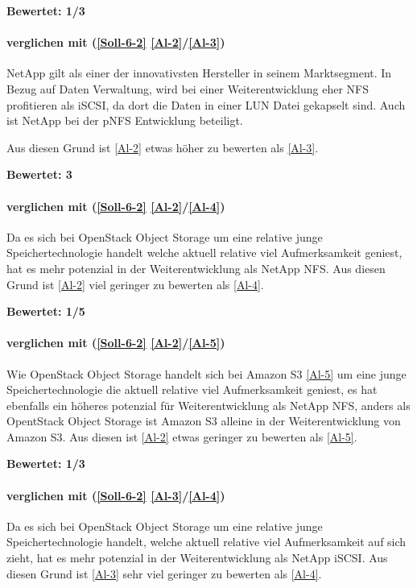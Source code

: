 \textbf{Bewertet: 1/3}


\paragraph*{  verglichen mit  (\ref{Soll-6-2} \ref{Al-2}/\ref{Al-3})}
NetApp gilt als einer der innovativsten Hersteller in seinem Marktsegment. In Bezug auf Daten Verwaltung, wird bei einer Weiterentwicklung eher NFS profitieren als iSCSI, da dort die Daten in einer LUN Datei gekapselt sind. Auch ist NetApp bei der pNFS Entwicklung beteiligt.

Aus diesen Grund ist  \ref{Al-2} etwas höher zu bewerten als  \ref{Al-3}.
 
\textbf{Bewertet: 3}

\paragraph*{  verglichen mit  (\ref{Soll-6-2} \ref{Al-2}/\ref{Al-4})}
Da es sich bei OpenStack Object Storage um eine relative junge Speichertechnologie handelt welche aktuell relative viel Aufmerksamkeit geniest, hat es mehr potenzial in der Weiterentwicklung als NetApp NFS. Aus diesen Grund ist  \ref{Al-2} viel geringer zu bewerten als  \ref{Al-4}.

\textbf{Bewertet: 1/5}

\paragraph*{  verglichen mit  (\ref{Soll-6-2} \ref{Al-2}/\ref{Al-5})}
Wie OpenStack Object Storage handelt sich bei Amazon S3 \ref{Al-5} um eine junge Speichertechnologie die aktuell relative viel Aufmerksamkeit geniest, es hat ebenfalls ein höheres potenzial für Weiterentwicklung als NetApp NFS, anders als OpentStack Object Storage ist Amazon S3 alleine in der Weiterentwicklung von Amazon S3. Aus diesen ist  \ref{Al-2} etwas geringer zu bewerten als  \ref{Al-5}.

\textbf{Bewertet: 1/3}

\paragraph*{  verglichen mit  (\ref{Soll-6-2} \ref{Al-3}/\ref{Al-4})}
Da es sich bei OpenStack Object Storage um eine relative junge Speichertechnologie handelt, welche aktuell relative viel Aufmerksamkeit auf sich zieht, hat es mehr potenzial in der Weiterentwicklung als NetApp iSCSI. Aus diesen Grund ist  \ref{Al-3} sehr viel geringer zu bewerten als  \ref{Al-4}.

